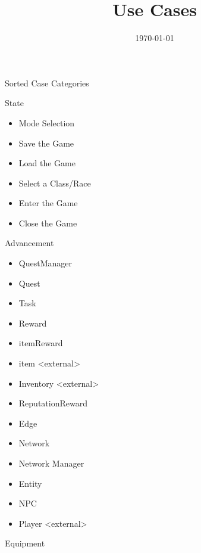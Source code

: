 \documentclass[12pt]{article}
\title{Use Cases}
\date{\today}
\begin{document}
\begin{section}{Sorted Case Categories}
\begin{subsection}{State}
\begin{itemize}
\item Mode Selection
\item Save the Game
\item Load the Game
\item Select a Class/Race
\item Enter the Game
\item Close the Game
\end{itemize}
\end{subsection}

\begin{subsection}{Advancement}
\begin{itemize}
\item QuestManager
\item Quest
\item Task
\item Reward
\item itemReward
\item item <external>
\item Inventory <external>
\item ReputationReward
\item Edge
\item Network
\item Network Manager
\item Entity
\item NPC
\item Player <external>
\end{itemize}
\end{subsection}

\begin{subsection}{Equipment}
\end{subsection}


\end{section}
\end{document}
